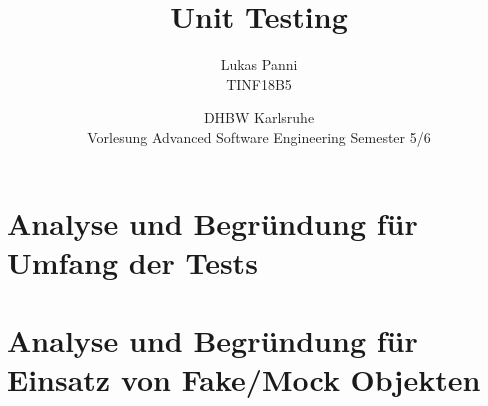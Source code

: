 \documentclass[12pt]{article}
\title{Unit Testing}
\date{DHBW Karlsruhe\\ Vorlesung Advanced Software Engineering Semester 5/6}
\author{Lukas Panni \\ TINF18B5}
\begin{document}
\maketitle

\newpage

\section{Analyse und Begründung für Umfang der Tests}

\newpage
\section{Analyse und Begründung für Einsatz von Fake/Mock Objekten }
\end{document}
